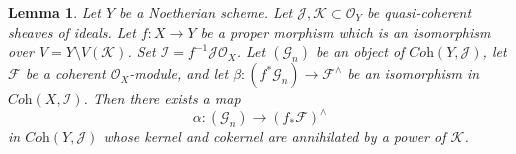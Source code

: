 \documentclass{stacks-project}
\theoremstyle{plain}
\newtheorem{lemma}[subsection]{Lemma}
\theoremstyle{definition}
\theoremstyle{remark}
\numberwithin{equation}{subsection}
\begin{document}
\begin{lemma}
\label{lemma-inverse-systems-push-pull}
Let $Y$ be a Noetherian scheme. Let
$\mathcal{J}, \mathcal{K} \subset \mathcal{O}_Y$
be quasi-coherent sheaves of ideals.
Let $f : X \to Y$ be a proper morphism which is an isomorphism
over $V = Y \setminus V(\mathcal{K})$.
Set $\mathcal{I} = f^{-1}\mathcal{J} \mathcal{O}_X$.
Let $(\mathcal{G}_n)$ be an object of $\textit{Coh}(Y, \mathcal{J})$,
let $\mathcal{F}$ be a coherent $\mathcal{O}_X$-module, and let
$\beta : (f^*\mathcal{G}_n)  \to \mathcal{F}^\wedge$ be an isomorphism in
$\textit{Coh}(X, \mathcal{I})$. Then there exists a map
$$
\alpha :
(\mathcal{G}_n)
\longrightarrow
(f_*\mathcal{F})^\wedge
$$
in $\textit{Coh}(Y, \mathcal{J})$ whose kernel and cokernel
are annihilated by a power of $\mathcal{K}$.
\end{lemma}
\end{document}
